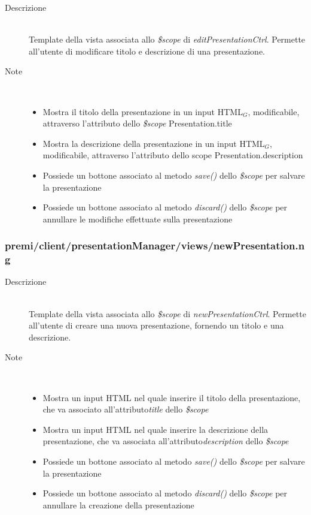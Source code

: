 \begin{description}
\item[Descrizione] \hfill \\
	Template della vista associata allo \textit{\$scope} di \textit{editPresentationCtrl}. Permette all'utente di modificare titolo e descrizione di una presentazione.
\item[Note] \hfill \\
	\begin{itemize}
			\item Mostra il titolo della presentazione in un input HTML$_G$, modificabile, attraverso l'attributo dello \textit{\$scope} Presentation.title
			\item Mostra la descrizione della presentazione in un input HTML$_G$, modificabile, attraverso l'attributo dello scope Presentation.description
			\item Possiede un bottone associato al metodo \textit{save()} dello \textit{\$scope} per salvare la presentazione
			\item Possiede un bottone associato al metodo \textit{discard()} dello \textit{\$scope} per annullare le modifiche effettuate sulla presentazione
	\end{itemize}
\end{description}

\subsubsection{premi/client/presentationManager/views/newPresentation.ng}

\begin{description}
\item[Descrizione] \hfill \\
	Template della vista associata allo \textit{\$scope} di \textit{newPresentationCtrl}. Permette all'utente di creare una nuova presentazione, fornendo un titolo e una descrizione.
\item[Note] \hfill \\
	\begin{itemize}
			\item Mostra un input HTML nel quale inserire il titolo della presentazione, che va associato all'attributo\textit{title} dello \textit{\$scope}
			\item Mostra un input HTML nel quale inserire la descrizione della presentazione, che va associata all'attributo\textit{description} dello \textit{\$scope}
			\item Possiede un bottone associato al metodo \textit{save()} dello \textit{\$scope} per salvare la presentazione
			\item Possiede un bottone associato al metodo \textit{discard()} dello \textit{\$scope} per annullare la creazione della presentazione
	\end{itemize}
\end{description}

